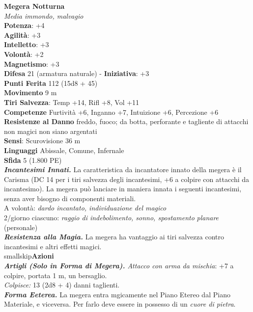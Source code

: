 \begin{multicols}{2}
\medskip\textbf{Megera Notturna}\\
\emph{Media immondo, malvagio}\\
\textbf{Potenza}: +4\\
\textbf{Agilità}: +3\\
\textbf{Intelletto}: +3\\
\textbf{Volontà}: +2\\
\textbf{Magnetismo}: +3\\
\textbf{Difesa} 21 (armatura naturale) - \textbf{Iniziativa}: +3\\
\textbf{Punti Ferita} 112 (15d8 + 45)\\
\textbf{Movimento} 9 m\\
\textbf{Tiri Salvezza}: Temp +14, Rifl +8, Vol +11\\
\textbf{Competenze} Furtività +6, Inganno +7, Intuizione +6, Percezione +6\\
\textbf{Resistenze al Danno} freddo, fuoco; da botta, perforante e tagliente di attacchi non magici non siano argentati\\
\textbf{Sensi}: Scurovisione 36 m\\
\textbf{Linguaggi} Abissale, Comune, Infernale\\
\textbf{Sfida} 5 (1.800 PE)\smallskip\\

\emph{\textbf{Incantesimi Innati.}} La caratteristica da incantatore innato della megera è il Carisma (DC 14 per i tiri salvezza degli incantesimi, +6 a colpire con attacchi da incantesimo). La megera può lanciare in maniera innata i seguenti incantesimi, senza aver bisogno di componenti materiali.\\

A volontà: \emph{dardo incantato, individuazione del magico}\\
2/giorno ciascuno: \emph{raggio di indebolimento, sonno, spostamento} \emph{planare} (personale)\\
\emph{\textbf{Resistenza alla Magia.}} La megera ha vantaggio ai tiri salvezza contro incantesimi e altri effetti magici.\\
smallskip\textbf{Azioni}\\
\emph{\textbf{Artigli (Solo in Forma di Megera).} Attacco con arma da mischia}: +7 a colpire, portata 1 m, un bersaglio.\\
\emph{Colpisce:} 13 (2d8 + 4) danni taglienti.\\

\emph{\textbf{Forma Eeterea.}} La megera entra mgicamente nel Piano Etereo dal Piano Materiale, e viceversa. Per farlo deve essere in possesso di un \emph{cuore di pietra}.\\


\end{multicols}
